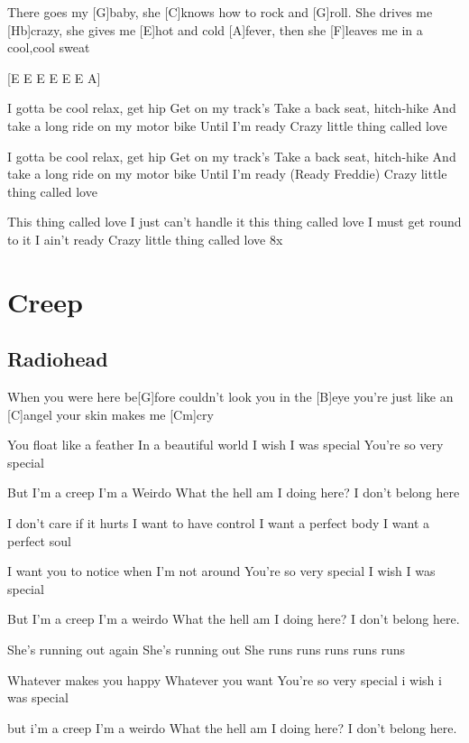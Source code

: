 \documentclass[a4paper,12pt]{article}
\begin{document}
\begin{multicols}{2}
\begin{guitar}
There goes my [G]baby, 
she [C]knows how to rock and [G]roll.
She drives me [Hb]crazy, 
she gives me [E]hot and cold [A]fever,
then she [F]leaves me in a cool,cool sweat


[E E E E E E A]


I gotta be cool relax, get hip 
Get on my track's 
Take a back seat, hitch-hike 
And take a long ride on my motor bike 
Until I'm ready 
Crazy little thing called love 


I gotta be cool relax, get hip 
Get on my track's 
Take a back seat, hitch-hike 
And take a long ride on my motor bike 
Until I'm ready (Ready Freddie) 
Crazy little thing called love 


This thing called love I just can't handle it 
this thing called love I must get round to it 
I ain't ready 
Crazy little thing called love   8x

\end{guitar}
\section{Creep}
\subsection*{Radiohead}
\begin{guitar}
[G B C Cm]

When you were here be[G]fore
couldn't look you in the [B]eye
you're just like an [C]angel
your skin makes me [Cm]cry


You float like a feather
In a beautiful world
I wish I was special
You're so very special 


But I'm a creep
I'm a Weirdo
What the hell am I doing here?
I don't belong here


I don't care if it hurts
I want to have control
I want a perfect body
I want a perfect soul


I want you to notice 
when I'm not around
You're so very special
I wish I was special


But I'm a creep
I'm a weirdo
What the hell am I doing here?
I don't belong here.


She's running out again
She's running out
She runs runs runs runs runs


Whatever makes you happy
Whatever you want
You're so very special
i wish i was special


but i'm a creep
I'm a weirdo
What the hell am I doing here?
I don't belong here.

\end{guitar}

\end{multicols}
\end{document}
